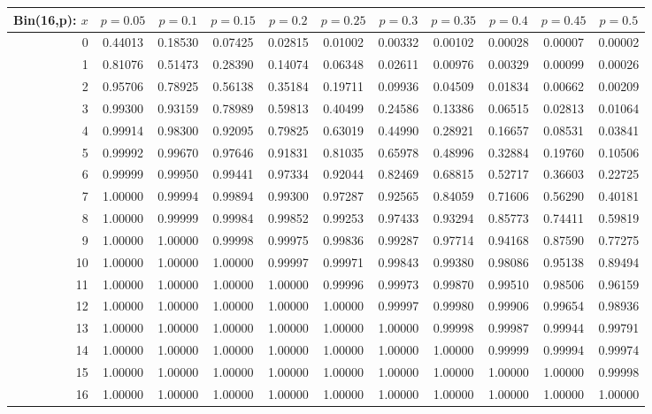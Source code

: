\vspace{8pt minus 6pt}
\begin{tabular}{@{\extracolsep{-2pt}}|r|c|c|c|c|c|c|c|c|c|c|}
\hline
Bin(16,p): $x$
   & $p\!=\!0.05$& $p\!=\!0.1$& $p\!=\!0.15$& $p\!=\!0.2$& $p\!=\!0.25$& $p\!=\!0.3$& $p\!=\!0.35$& $p\!=\!0.4$& $p\!=\!0.45$& $p\!=\!0.5$\\\hline
  0&0.44013&0.18530&0.07425&0.02815&0.01002&0.00332&0.00102&0.00028&0.00007&0.00002\\
  1&0.81076&0.51473&0.28390&0.14074&0.06348&0.02611&0.00976&0.00329&0.00099&0.00026\\
  2&0.95706&0.78925&0.56138&0.35184&0.19711&0.09936&0.04509&0.01834&0.00662&0.00209\\
  3&0.99300&0.93159&0.78989&0.59813&0.40499&0.24586&0.13386&0.06515&0.02813&0.01064\\
  4&0.99914&0.98300&0.92095&0.79825&0.63019&0.44990&0.28921&0.16657&0.08531&0.03841\\
  5&0.99992&0.99670&0.97646&0.91831&0.81035&0.65978&0.48996&0.32884&0.19760&0.10506\\
  6&0.99999&0.99950&0.99441&0.97334&0.92044&0.82469&0.68815&0.52717&0.36603&0.22725\\
  7&1.00000&0.99994&0.99894&0.99300&0.97287&0.92565&0.84059&0.71606&0.56290&0.40181\\
  8&1.00000&0.99999&0.99984&0.99852&0.99253&0.97433&0.93294&0.85773&0.74411&0.59819\\
  9&1.00000&1.00000&0.99998&0.99975&0.99836&0.99287&0.97714&0.94168&0.87590&0.77275\\
 10&1.00000&1.00000&1.00000&0.99997&0.99971&0.99843&0.99380&0.98086&0.95138&0.89494\\
 11&1.00000&1.00000&1.00000&1.00000&0.99996&0.99973&0.99870&0.99510&0.98506&0.96159\\
 12&1.00000&1.00000&1.00000&1.00000&1.00000&0.99997&0.99980&0.99906&0.99654&0.98936\\
 13&1.00000&1.00000&1.00000&1.00000&1.00000&1.00000&0.99998&0.99987&0.99944&0.99791\\
 14&1.00000&1.00000&1.00000&1.00000&1.00000&1.00000&1.00000&0.99999&0.99994&0.99974\\
 15&1.00000&1.00000&1.00000&1.00000&1.00000&1.00000&1.00000&1.00000&1.00000&0.99998\\
 16&1.00000&1.00000&1.00000&1.00000&1.00000&1.00000&1.00000&1.00000&1.00000&1.00000\\
\hline
\end{tabular}


